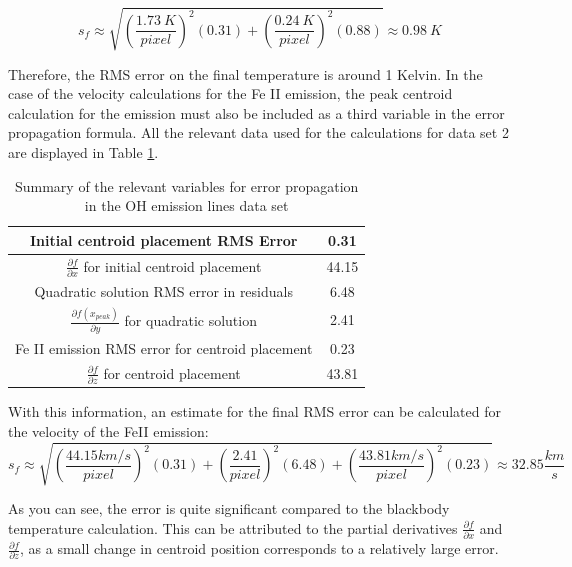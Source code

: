 \documentclass{article}
\begin{document}
\begin{equation}
  s_f \approx \sqrt{(\frac{1.73 \ K}{pixel})^2(0.31) + (\frac{0.24 \ K}{pixel})^2(0.88)} \approx 0.98 \ K
\end{equation}

\noindent
Therefore, the RMS error on the final temperature is around 1 Kelvin. In the case of the velocity calculations for the Fe II emission, the peak centroid calculation for the emission must also be included as a third variable in the error propagation formula. All the relevant data used
for the calculations for data set 2 are displayed in Table \ref{tab:q2_errors}.

\begin{table}[h]
  \centering
  \begin{tabular}{|c|c|}
  \hline
  Initial centroid placement RMS Error &  0.31 \\ \hline
  $\frac{\partial f}{\partial x}$ for initial centroid placement & 44.15 \\ \hline
  Quadratic solution RMS error in residuals & 6.48 \\ \hline
  $\frac{\partial f(x_{peak})}{\partial y}$ for quadratic solution & 2.41 \\ \hline
  Fe II emission RMS error for centroid placement & 0.23 \\ \hline
  $\frac{\partial f}{\partial z}$ for centroid placement & 43.81 \\ \hline
  \end{tabular}
  \caption{Summary of the relevant variables for error propagation in the OH emission lines data set}
  \label{tab:q2_errors}
\end{table}

\noindent
With this information, an estimate for the final RMS error can be calculated for the velocity of the FeII emission:
\begin{equation}
    s_f \approx \sqrt{(\frac{44.15 km/s}{pixel})^2(0.31) + (\frac{2.41}{pixel})^2(6.48) + (\frac{43.81 km/s}{pixel})^2 (0.23)} \approx 32.85 \frac{km}{s}
\end{equation}

\noindent
As you can see, the error is quite significant compared to the blackbody temperature calculation. This can be attributed to the partial derivatives $\frac{\partial f}{\partial x}$ and $\frac{\partial f}{\partial z}$, as a small change in centroid position corresponds to a relatively large error. 
\end{document}
